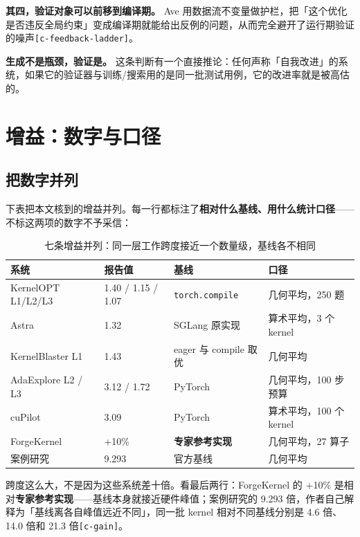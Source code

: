 \textbf{其四，验证对象可以前移到编译期。} Ave 用数据流不变量做护栏，把「这个优化是否违反全局约束」变成编译期就能给出反例的问题，从而完全避开了运行期验证的噪声{\scriptsize\texttt{[c-\hspace{0pt}feedback-\hspace{0pt}ladder]}}。


\textbf{生成不是瓶颈，验证是。} 这条判断有一个直接推论：任何声称「自我改进」的系统，如果它的验证器与训练/搜索用的是同一批测试用例，它的改进率就是被高估的。


\section{增益：数字与口径}

\subsection{把数字并列}

下表把本文核到的增益并列。每一行都标注了\textbf{相对什么基线、用什么统计口径}——不标这两项的数字不予采信：


\begin{table}[t]
\centering
\footnotesize
\setlength{\tabcolsep}{4pt}
\caption{七条增益并列：同一层工作跨度接近一个数量级，基线各不相同}
\label{tab:4}
\begin{tabular}{llll}
\toprule
系统 & 报告值 & 基线 & 口径 \\
\midrule
KernelOPT L1/L2/L3 & 1.40 / 1.15 / 1.07 & \texttt{torch.compile} & 几何平均，250 题 \\
Astra & 1.32 & SGLang 原实现 & 算术平均，3 个 kernel \\
KernelBlaster L1 & 1.43 & eager 与 compile 取优 & 几何平均 \\
AdaExplore L2 / L3 & 3.12 / 1.72 & PyTorch & 几何平均，100 步预算 \\
cuPilot & 3.09 & PyTorch & 算术平均，100 个 kernel \\
ForgeKernel & +10\% & \textbf{专家参考实现} & 几何平均，27 算子 \\
案例研究 & 9.293 & 官方基线 & 几何平均 \\
\bottomrule
\end{tabular}
\end{table}

跨度这么大，不是因为这些系统差十倍。看最后两行：ForgeKernel 的 +10\% 是相对\textbf{专家参考实现}——基线本身就接近硬件峰值；案例研究的 9.293 倍，作者自己解释为「基线离各自峰值远近不同」，同一批 kernel 相对不同基线分别是 4.6 倍、14.0 倍和 21.3 倍{\scriptsize\texttt{[c-\hspace{0pt}gain]}}。


